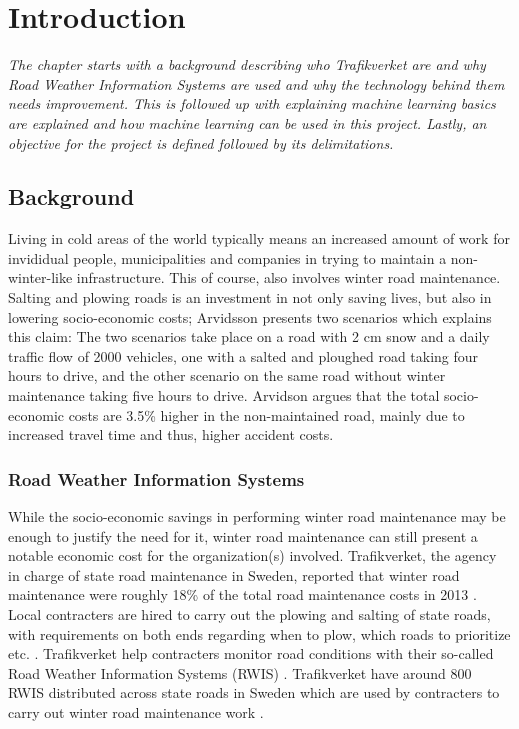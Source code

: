 \chapter{Introduction}
\emph{The chapter starts with a background describing who Trafikverket are and why Road Weather Information Systems are used and why the technology behind them needs improvement. This is followed up with explaining machine learning basics are explained and how machine learning can be used in this project. Lastly, an objective for the project is defined followed by its delimitations. }

\section{Background} \label{sec:background}
	Living in cold areas of the world typically means an increased amount of work for invididual people, municipalities and companies in trying to maintain a non-winter-like infrastructure. This of course, also involves winter road maintenance. Salting and plowing roads is an investment in not only saving lives, but also in lowering socio-economic costs; Arvidsson \cite{ARTICLE:1} presents two scenarios which explains this claim: The two scenarios take place on a road with 2 cm snow and a daily traffic flow of 2000 vehicles, one with a salted and ploughed road taking four hours to drive, and the other scenario on the same road without winter maintenance taking five hours to drive. Arvidson argues that the total socio-economic costs are 3.5\% higher in the non-maintained road, mainly due to increased travel time and thus, higher accident costs. 


	\subsection{Road Weather Information Systems}
	While the socio-economic savings in performing winter road maintenance may be enough to justify the need for it, winter road maintenance can still present a notable economic cost for the organization(s) involved. Trafikverket, the agency in charge of state road maintenance in Sweden, reported that winter road maintenance were roughly 18\% of the total road maintenance costs in 2013 \cite{REPORT:1}. Local contracters are hired to carry out the plowing and salting of state roads, with requirements on both ends regarding when to plow, which roads to prioritize etc. \cite{WEBSITE:2}. Trafikverket help contracters monitor road conditions with their so-called Road Weather Information Systems (RWIS) \cite{WEBSITE:2}. Trafikverket have around 800 RWIS distributed across state roads in Sweden which are used by contracters to carry out winter road maintenance work \cite{WEBSITE:2}. 

